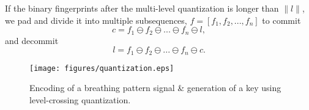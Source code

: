 If the binary fingerprints after the multi-level quantization is longer than $\|l\|$, we pad and divide it into multiple subsequences, $f = [ f_1, f_2,...,f_n]$ to commit
\[
c = f_1 \ominus f_2 \ominus ... \ominus f_n \ominus l,
\]
and decommit
\[
l = f_1 \ominus f_2 \ominus ... \ominus f_n \ominus c.
\]

\begin{figure}[h]
\centering
\texttt{[image: figures/quantization.eps]}
\caption{Encoding of a breathing pattern signal \& generation of a key using level-crossing quantization.}
\label{fig:quantization}
\end{figure}




